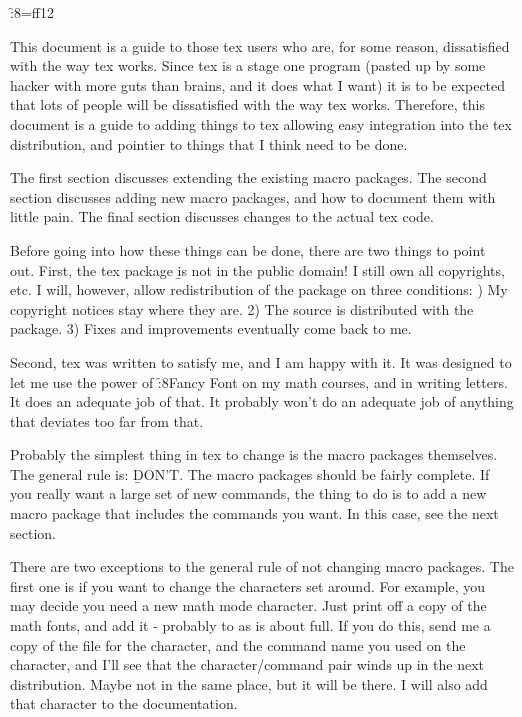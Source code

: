 
\f:8=ff12
\def\FF{\f:8}


This document is a guide to those tex users who are, for some
reason, dissatisfied with the way tex works. Since tex is a stage
one program (pasted up by some hacker with more guts than brains,
and it does what I want) it is to be expected that lots of people
will be dissatisfied with the way tex works. Therefore, this
document is a guide to adding things to tex allowing easy
integration into the tex distribution, and pointier to things
that I think need to be done.

The first section discusses extending the existing macro
packages.  The second section discusses adding new macro
packages, and how to document them with little pain. The final
section discusses changes to the actual tex code.

Before going into how these things can be done, there are two
things to point out. First, the tex package {\b is not in the
public domain!} I still own all copyrights, etc. I will,
however, allow redistribution of the package on three conditions:
{) My copyright notices stay where they are.
2) The source is distributed with the package.
3) Fixes and improvements eventually come back to me.
}

Second, tex was written to satisfy me, and I am happy with it. It
was designed to let me use the power of {\FF Fancy Font} on my
math courses, and in writing letters.  It does an adequate job of
that. It probably won't do an adequate job of anything that
deviates too far from that.


Probably the simplest thing in tex to change is the macro
packages themselves. The general rule is: {\b DON'T.} The macro
packages should be fairly complete. If you really want a large
set of new commands, the thing to do is to add a new macro
package that includes the commands you want. In this case, see
the next section.


There are two exceptions to the general rule of not changing
macro packages. The first one is if you want to change the
characters set around. For example, you may decide you need a new
math mode character. Just print off a copy of the math fonts, and
add it - probably to  as  is about
full. If you do this, send me a copy of the  file
for the character, and the command name you used on the
character, and I'll see that the character/command pair winds up
in the next distribution. Maybe not in the same place, but it
will be there. I will also add that character to the
documentation.

